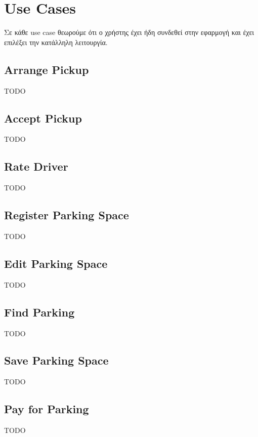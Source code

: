 \documentclass[11pt]{article}
\begin{document}
\newpage

\section{Use Cases}

Σε κάθε use case θεωρούμε ότι ο χρήστης έχει ήδη συνδεθεί στην εφαρμογή και
έχει επιλέξει την κατάλληλη λειτουργία.







\subsection{Arrange Pickup}
TODO

\subsection{Accept Pickup}
TODO



\subsection{Rate Driver}
TODO

\subsection{Register Parking Space}
TODO

\subsection{Edit Parking Space}
TODO

\subsection{Find Parking}
TODO



\subsection{Save Parking Space}
TODO

\subsection{Pay for Parking}
TODO
\end{document}
